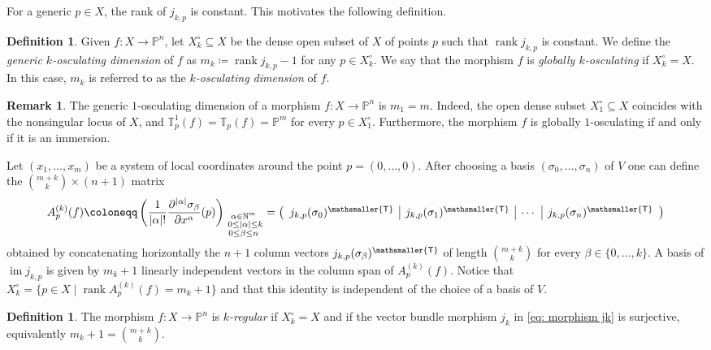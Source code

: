 \documentclass[11pt,reqno]{amsart}
\numberwithin{equation}{section}
\theoremstyle{plain}
\numberwithin{theorem}{section}
\theoremstyle{definition}
\newtheorem{definition}[theorem]{Definition}
\newtheorem{remark}[theorem]{Remark}
\newcommand{\N}{\mathbb{N}}
\renewcommand{\P}{\mathbb{P}}
\newcommand{\T}{\mathbb{T}}
\newcommand{\rank}{\operatorname{rank}}
\newcommand{\image}{\operatorname{im}}
\newcommand{\mT}{\mathsmaller{\mathsf{T}}}
\begin{document}
For a generic $p\in X$, the rank of $j_{k,p}$ is constant. This motivates the following definition.

\begin{definition}\label{def: globally k-osculating}
Given $f\colon X\to\P^n$, let $X_k^{\circ}\subseteq X$ be the dense open subset of $X$ of points $p$ such that $\rank j_{k,p}$ is constant. We define the {\em generic $k$-osculating dimension} of $f$ as $m_k\coloneqq\rank j_{k,p}-1$ for any $p\in X_k^{\circ}$.
We say that the morphism $f$ is {\em globally $k$-osculating} if $X_k^{\circ}=X$. In this case, $m_k$ is referred to as the {\em $k$-osculating dimension} of $f$.
\end{definition}
\begin{remark}
The generic $1$-osculating dimension of a morphism $f\colon X\to\P^n$ is $m_1=m$. Indeed, the open dense subset $X_1^\circ\subseteq X$ coincides with the nonsingular locus of $X$, and $\T_p^1(f)=\T_p(f)=\P^m$ for every $p\in X_1^\circ$. Furthermore, the morphism $f$ is globally $1$-osculating if and only if it is an immersion.
\end{remark}
    
Let $(x_1,\dots,x_m)$ be a system of local coordinates around the point $p=(0,\dots,0)$. After choosing a basis $(\sigma_0,\dots,\sigma_n)$ of $V$ one can define the $\binom{m+k}{k}\times (n+1)$ matrix
\begin{equation}\label{eq: matrix A}
A^{(k)}_p(f)\coloneqq \left(\frac{1}{|\alpha|!}\frac{\partial^{|\alpha|}\sigma_\beta}{\partial x^\alpha}(p)\right)_{\substack{\alpha\in\N^m\\\ 0\le|\alpha|\le k\\0\le\beta\le n}} =
\left(
\begin{array}{c|c|c|c}
j_{k,p}(\sigma_0)^\mT & j_{k,p}(\sigma_1)^\mT & \cdots & j_{k,p}(\sigma_n)^\mT 
\end{array}
\right)
\end{equation}
obtained by concatenating horizontally the $n+1$ column vectors $j_{k,p}(\sigma_\beta)^\mT$ of length $\binom{m+k}{k}$ for every $\beta\in\{0,\dots,k\}$.
A basis of $\image j_{k,p}$ is given by $m_k+1$ linearly independent vectors in the column span of $A^{(k)}_p(f)$.
Notice that $X_k^{\circ}=\{p\in X\mid \rank A_p^{(k)}(f)=m_k+1\}$ and that this identity is independent of the choice of a basis of $V.$

\begin{definition}\label{def: k-regular}
The morphism $f\colon X \to\P^n$ is {\em $k$-regular} if $X_k^{\circ}=X$ and if the vector bundle morphism $j_k$ in \eqref{eq: morphism jk} is surjective, equivalently $m_k+1=\binom{m+k}{k}$.
\end{definition}
\end{document}
